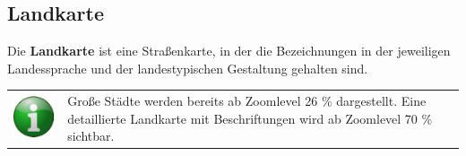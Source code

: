 \documentclass[10pt]{scrreprt}
\begin{document}
\newpage
\subsection{Landkarte}  
Die \textbf{Landkarte} ist eine Straßenkarte, in der die Bezeichnungen in der jeweiligen Landessprache und der landestypischen Gestaltung gehalten sind.

\vspace{3mm}
\begin{figure}[!htb]
	\centering
    \hspace{5mm}
\end{figure}

\vspace{3mm}
\begin{tabular}{>{\centering \arraybackslash}m{1cm} m{14cm}}
\includegraphics[scale=0.5]{images/info.eps} & Große Städte werden bereits ab Zoomlevel 26 \% dargestellt. Eine detaillierte Landkarte mit Beschriftungen wird ab Zoomlevel 70 \% sichtbar.
\end{tabular}
\end{document}
